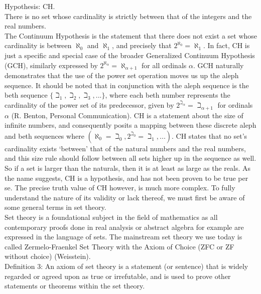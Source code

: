 \documentclass[10pt,letterpaper]{amsart}
\numberwithin{equation}{section}
\theoremstyle{plain}
\theoremstyle{definition}
\numberwithin{equation}{section}
\begin{document}
\noindent Hypothesis: CH. \\
There is no set whose cardinality is strictly between that of the integers and the real numbers.\\

The Continuum Hypothesis is the statement that there does not exist a set whose cardinality is between $\aleph_0$ and $\aleph_1$, and precisely that $2^{\aleph_0}=\aleph_1$. In fact, CH is just a specific and special case of the broader Generalized Continuum Hypothesis (GCH), similarly expressed by $2^{\aleph_\alpha}=\aleph_{\alpha+1}$ for all ordinals $\alpha$. GCH naturally demonstrates that the use of the power set operation moves us up the aleph sequence. It should be noted that in conjunction with the aleph sequence is the beth sequence $\{ \beth_1, \beth_2, \beth_3,...\}$, where each beth number represents the cardinality of the power set of its predecessor, given by $2^{\beth_\alpha}=\beth_{\alpha+1}$ for ordinals $\alpha$ (R. Benton, Personal Communication). CH is a statement about the size of infinite numbers, and consequently posits a mapping between these discrete aleph and beth sequences where $(\aleph_0=\beth_0, 2^{\beth_0}=\beth_1,...)$.  CH states that no set's cardinality exists `between' that of the natural numbers and the real numbers, and this size rule should follow between all sets higher up in the sequence as well. So if a set is larger than the naturals, then it is at least as large as the reals. As the name suggests, CH is a hypothesis, and has not been proven to be true per se. The precise truth value of CH however, is much more complex. To fully understand the nature of its validity or lack thereof, we must first be aware of some general terms in set theory.\\

Set theory is a foundational subject in the field of mathematics as all contemporary proofs done in real analysis or abstract algebra for example are expressed in the language of sets. The mainstream set theory we use today is called Zermelo-Fraenkel Set Theory with the Axiom of Choice (ZFC or ZF without choice) (Weisstein). \\

\noindent Definition 3: 
An axiom of set theory is a statement (or sentence) that is widely regarded or agreed upon as true or irrefutable, and is used to prove other statements or theorems within the set theory. \\
\end{document}
